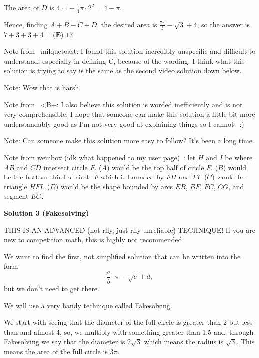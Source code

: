 \begin{enumerate}
 The area of $D$ is $4 \cdot 1-\frac{1}{4}\pi \cdot 2^2=4-\pi$.

 Hence, finding $A+B-C+D$, the desired area is $\frac{7\pi}{3}-\sqrt{3}+4$, so the answer is $7+3+3+4=\boxed{\textbf{(E) } 17}$.

 Note from ~milquetoast: I found this solution incredibly unspecific and difficult to understand, especially in defining C,  because of the wording. I think what this solution is trying to say is the same as the second video solution down below.

 Note: Wow that is harsh

 Note from ~<B+: I also believe this solution is worded inefficiently and is not very comprehensible. I hope that someone can make this solution a little bit more understandably good as I'm not very good at explaining things so I cannot. :)

 Note: Can someone make this solution more easy to follow? It’s been a long time.

 Note from \href{https://artofproblemsolving.com/wiki/index.php?title=User:Wembox&action=edit&redlink=1}{wembox} (idk what happened to my user page) : let $H$ and $I$ be where $AB$ and $CD$ intersect circle $F$. ($A$) would be the top half of circle $F$. ($B$) would be the bottom third of circle $F$ which is bounded by $FH$ and $FI$. ($C$) would be triangle $HFI$. ($D$) would be the shape bounded by arcs $EB$, $BF$, $FC$, $CG$, and segment $EG$.

 



\textbf{Solution 3 (Fakesolving)}

THIS IS AN ADVANCED (not rlly, just rlly unreliable) TECHNIQUE! If you are new to competition math, this is highly not recommended.

 We want to find the first, not simplified solution that can be written into the form 
 \[\frac{a}{b}\cdot\pi-\sqrt{c}+d,\] but we don't need to get there.

 We will use a very handy technique called \href{https://artofproblemsolving.com/wiki/index.php/Fakesolving?srsltid=AfmBOooIYJBasY2JG2w6ib8tmkZzk\_s4gHj3D43Dmllv1jje2xbw7KzG}{Fakesolving}.

 We start with seeing that the diameter of the full circle is greater than 2 but less than and almost 4, so, we multiply with something greater than 1.5 and, through \href{https://artofproblemsolving.com/wiki/index.php/Fakesolving?srsltid=AfmBOooIYJBasY2JG2w6ib8tmkZzk\_s4gHj3D43Dmllv1jje2xbw7KzG}{Fakesolving} we say that the diameter is \( 2\sqrt{3} \) which means the radius is \( \sqrt{3} \). This means the area of the full circle is \( 3\pi \).


\end{enumerate}
